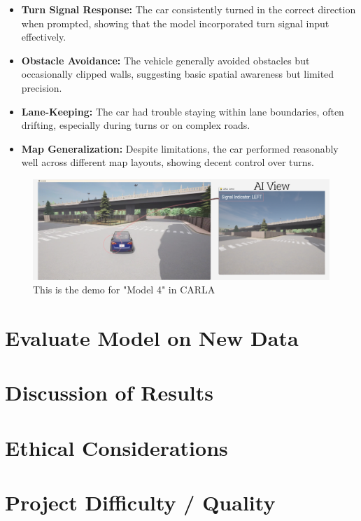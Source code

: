 \documentclass{article} %
\begin{document}
\begin{itemize}
  \item \textbf{Turn Signal Response:} The car consistently turned in the correct direction when prompted, showing that the model incorporated turn signal input effectively.

  \item \textbf{Obstacle Avoidance:} The vehicle generally avoided obstacles but occasionally clipped walls, suggesting basic spatial awareness but limited precision.

  \item \textbf{Lane-Keeping:} The car had trouble staying within lane boundaries, often drifting, especially during turns or on complex roads.

  \item \textbf{Map Generalization:} Despite limitations, the car performed reasonably well across different map layouts, showing decent control over turns.
\end{itemize}


\begin{figure}[H] %
    \centering
    \includegraphics[width=1.0\textwidth]{model4demo.png} %
    \caption{This is the demo for "Model 4" in CARLA}
    \label{fig:model4demo}
\end{figure}


\section{Evaluate Model on New Data}

\section{Discussion of Results}

\section{Ethical Considerations}

\section{Project Difficulty / Quality}


\label{last_page}



\end{document}
